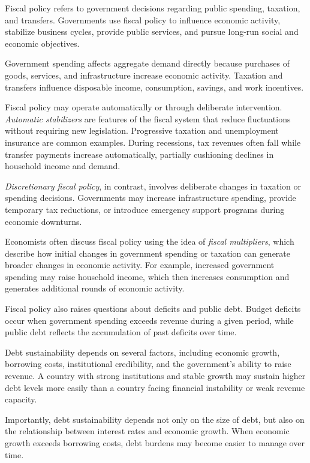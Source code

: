 \documentclass[
  11pt,
  oneside]{book}
\begin{document}
Fiscal policy refers to government decisions regarding public spending, taxation, and transfers. Governments use fiscal policy to influence economic activity, stabilize business cycles, provide public services, and pursue long-run social and economic objectives.

Government spending affects aggregate demand directly because purchases of goods, services, and infrastructure increase economic activity. Taxation and transfers influence disposable income, consumption, savings, and work incentives.

Fiscal policy may operate automatically or through deliberate intervention. \emph{Automatic stabilizers} are features of the fiscal system that reduce fluctuations without requiring new legislation. Progressive taxation and unemployment insurance are common examples. During recessions, tax revenues often fall while transfer payments increase automatically, partially cushioning declines in household income and demand.

\emph{Discretionary fiscal policy}, in contrast, involves deliberate changes in taxation or spending decisions. Governments may increase infrastructure spending, provide temporary tax reductions, or introduce emergency support programs during economic downturns.

Economists often discuss fiscal policy using the idea of \emph{fiscal multipliers}, which describe how initial changes in government spending or taxation can generate broader changes in economic activity. For example, increased government spending may raise household income, which then increases consumption and generates additional rounds of economic activity.

Fiscal policy also raises questions about deficits and public debt. Budget deficits occur when government spending exceeds revenue during a given period, while public debt reflects the accumulation of past deficits over time.

Debt sustainability depends on several factors, including economic growth, borrowing costs, institutional credibility, and the government's ability to raise revenue. A country with strong institutions and stable growth may sustain higher debt levels more easily than a country facing financial instability or weak revenue capacity.

Importantly, debt sustainability depends not only on the size of debt, but also on the relationship between interest rates and economic growth. When economic growth exceeds borrowing costs, debt burdens may become easier to manage over time.
\end{document}
